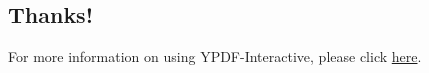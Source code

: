 \documentclass[10pt,letterpaper,twocolumn,landscape]{article}
\newenvironment{cframed}{\begin{mdframed}[linecolor=logoPeach,linewidth=0.4mm]}{\end{mdframed}}
\newcommand{\YPDFI}{{\fontfamily{fvs}\selectfont YPDF-Interactive}}
\begin{document}
\begin{cframed}
\begin{tabular}{l c l l p{2.6cm}}



\end{tabular}


\vspace{0.8em}

\end{cframed}
\vspace{-1em}
\subsection*{Thanks!}
\vspace{-1em}
For more information on using \YPDFI{}, please click 
\href{http://mmui-lts-dev.193b.starter-ca-central-1.openshiftapps.com/}{here}.
\end{document}
